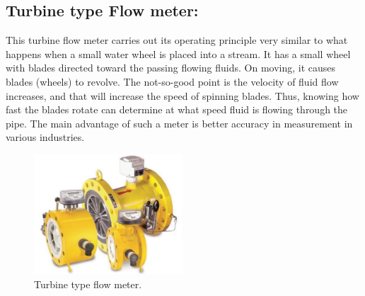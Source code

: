 \subsection{Turbine type Flow meter:}
This turbine flow meter carries out its operating principle very similar to what happens when a small water wheel is placed into a stream. It has a small wheel with blades directed toward the passing flowing fluids. On moving, it causes blades (wheels) to revolve. The not-so-good point is the velocity of fluid flow increases, and that will increase the speed of spinning blades. Thus, knowing how fast the blades rotate can determine at what speed fluid is flowing through the pipe. The main advantage of such a meter is better accuracy in measurement in various industries.

\begin{figure}[h!]
    \centering
    \includegraphics[width=2.18787in,height=1.76042in]{figs/flowmeters/image23.png}
    \caption{Turbine type flow meter.}
    \label{fig:Turbine type flow meter}
\end{figure}

